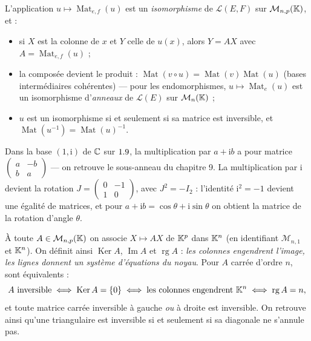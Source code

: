 \begin{theoreme}
L'application $u\mapsto\operatorname{Mat}_{e,f}(u)$ est un
\emph{isomorphisme} de $\mathcal{L}(E,F)$ sur $\mathcal{M}_{n,p}(\mathbb{K})$, et :
\begin{itemize}[label={\color{otNavy}\textbullet},leftmargin=1.4em,itemsep=0.6mm,topsep=0.8mm]
  \item si $X$ est la colonne de $x$ et $Y$ celle de $u(x)$, alors
    $Y=AX$ avec $A=\operatorname{Mat}_{e,f}(u)$ ;
  \item la composée devient le produit :
    $\operatorname{Mat}(v\circ u)=\operatorname{Mat}(v)\operatorname{Mat}(u)$
    (bases intermédiaires cohérentes) — pour les endomorphismes,
    $u\mapsto\operatorname{Mat}_e(u)$ est un isomorphisme d'\emph{anneaux}
    de $\mathcal{L}(E)$ sur $\mathcal{M}_n(\mathbb{K})$ ;
  \item $u$ est un isomorphisme si et seulement si sa matrice est
    inversible, et $\operatorname{Mat}(u^{-1})=\operatorname{Mat}(u)^{-1}$.
\end{itemize}
\end{theoreme}

\begin{exemple}
Dans la base $(1,\mathrm{i})$ de $\mathbb{C}$ sur $1.9$, la multiplication par
$a+\mathrm{i}b$ a pour matrice
$\begin{pmatrix}a&-b\\b&a\end{pmatrix}$ — on retrouve le sous-anneau du
chapitre 9. La multiplication par $\mathrm{i}$ devient la rotation
$J=\begin{pmatrix}0&-1\\1&0\end{pmatrix}$, avec $J^{2}=-I_2$ : l'identité
$\mathrm{i}^{2}=-1$ devient une égalité de matrices, et pour
$a+\mathrm{i}b=\cos\theta+\mathrm{i}\sin\theta$ on obtient la matrice de la
rotation d'angle $\theta$.
\end{exemple}


\begin{theoreme}
À toute $A\in\mathcal{M}_{n,p}(\mathbb{K})$ on associe $X\mapsto AX$ de $\mathbb{K}^{p}$
dans $\mathbb{K}^{n}$ (en identifiant $\mathcal{M}_{n,1}$ et $\mathbb{K}^{n}$). On définit
ainsi $\operatorname{Ker}A$, $\operatorname{Im}A$ et
$\operatorname{rg}A$ : \emph{les colonnes engendrent l'image, les lignes
donnent un système d'équations du noyau}. Pour $A$ carrée d'ordre $n$,
sont équivalents :
\[
A\ \text{inversible}
\iff\operatorname{Ker}A=\left\{0\right\}
\iff\text{les colonnes engendrent }\mathbb{K}^{n}
\iff\operatorname{rg}A=n ,
\]
et toute matrice carrée inversible à gauche \emph{ou} à droite est
inversible. On retrouve ainsi qu'une triangulaire est inversible si et
seulement si sa diagonale ne s'annule pas.
\end{theoreme}

